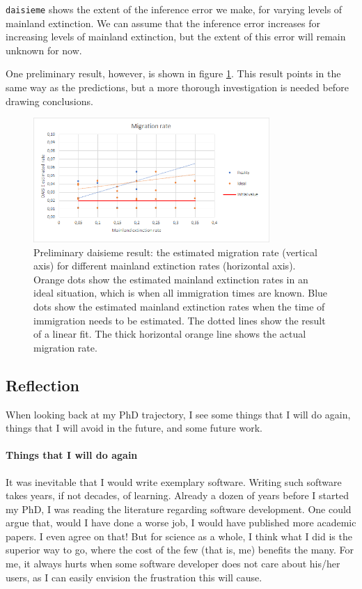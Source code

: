 \verb;daisieme; shows the extent of the inference error we make,
for varying levels of mainland extinction. We can assume that the inference 
error increases for increasing levels of mainland extinction, but the extent
of this error will remain unknown for now. 

One preliminary result, however, is shown in figure \ref{fig:daisieme_results}.
This result points in the same way as the predictions, but a more thorough
investigation is needed before drawing conclusions.

\begin{figure}[]
  \includegraphics[width=0.8\textwidth]{daisieme_migration4.png}
  \caption{
    Preliminary daisieme result: the estimated migration rate (vertical
    axis) for different mainland extinction rates (horizontal axis).
    Orange dots show the estimated mainland extinction rates
    in an ideal situation, which is when all immigration times are known.
    Blue dots show the estimated mainland extinction rates 
    when the time of immigration needs to be estimated.
    The dotted lines show the result of a linear fit.
    The thick horizontal orange line shows the actual migration rate.
  }
  \label{fig:daisieme_results}
\end{figure}

\subsection{Reflection}

When looking back at my PhD trajectory, I see some things that I will
do again, things that I will avoid in the future, and some future work.

\paragraph{Things that I will do again} 

It was inevitable that I would write exemplary software. Writing such
software takes years, if not decades, of learning. 
Already a dozen of years before I started my PhD, I was reading the literature
regarding software development. One could argue that, would I have done 
a worse job, I would have published more academic papers. I even agree
on that! But for science as a whole, I think what I did is the superior
way to go, where the cost of the few (that is, me) benefits the many. 
For me, it always hurts when some software developer does not
care about his/her users, as I can easily envision the frustration 
this will cause.

